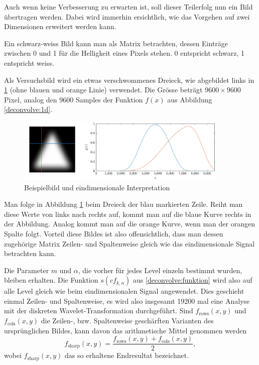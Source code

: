 Auch wenn keine Verbesserung zu erwarten ist, soll dieser Teilerfolg nun ein Bild übertragen werden.
Dabei wird immerhin ersichtlich, wie das Vorgehen auf zwei Dimensionen erweitert werden kann.

Ein schwarz-weiss Bild kann man als Matrix betrachten, dessen Einträge zwischen 0 und 1 für die Helligkeit eines Pixels stehen.
0 entspricht schwarz, 1 entspricht weiss.

Als Versuchsbild wird ein etwas verschwommenes Dreieck, wie abgebildet links in \ref{deconvolve:example} (ohne blauen und orange Linie) verwendet.
Die Grösse beträgt $9600\times9600$ Pixel, analog den 9600 Samples der Funktion $f(x)$ aus Abbildung \ref{deconvolve:1d}.
\begin{figure}[h]
\centering
\includegraphics[width=0.9\textwidth]{./papers/deconvolve/pictures/dreieck.pdf}
\caption{Beispielbild und eindimensionale Interpretation\label{deconvolve:example}}
\end{figure}

Man folge in Abbildung \ref{deconvolve:example} beim Dreieck der blau markierten \glqq Zeile\grqq{}.
Reiht man diese Werte von links nach rechts auf, kommt man auf die blaue Kurve rechts in der Abbildung.
Analog kommt man auf die orange Kurve, wenn man der orangen \glqq Spalte\grqq{} folgt.
Vorteil diese Bildes ist also offensichtlich, dass man dessen zugehörige Matrix Zeilen- und Spaltenweise gleich wie das eindimensionale Signal betrachten kann.

Die Parameter $m$ und $\alpha$, die vorher für jedes Level einzeln bestimmt wurden, bleiben erhalten.
Die Funktion $s(cf_{k,n})$ aus \eqref{deconvolve:funktion} wird also auf alle Level gleich wie beim eindimensionalen Signal angewendet.
Dies geschieht einmal Zeilen- und Spaltenweise, es wird also insgesamt 19200 mal eine Analyse mit der diskreten Wavelet-Transformation durchgeführt.
Sind $f_\text{rows}(x,y)$ und $f_\text{cols}(x,y)$ die Zeilen-, bzw. Spaltenweise \glqq geschärften\grqq{} Varianten des ursprünglichen Bildes, kann davon das arithmetische Mittel genommen werden
$$f_\text{sharp}(x,y)=\frac{f_\text{rows}(x,y)+f_\text{cols}(x,y)}{2},$$
wobei $f_\text{sharp}(x,y)$ das so erhaltene Endresultat bezeichnet.

